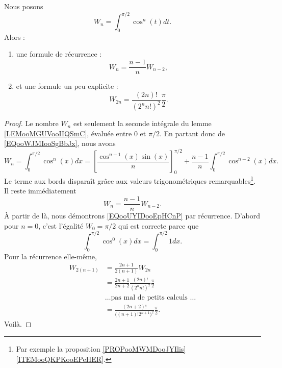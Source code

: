 \begin{lemma}       \label{LEMooUOIBooLyMDft}
	Nous posons
	\begin{equation}
		W_n=\int_0^{\pi/2}\cos^n(t)dt.
	\end{equation}
	Alors :
	\begin{enumerate}
		\item
		      une formule de récurrence :
		      \begin{equation}        \label{EQooILMZooBUgJpk}
			      W_n=\frac{ n-1 }{ n }W_{n-2},
		      \end{equation}
		\item et une formule un peu explicite :
		      \begin{equation}        \label{EQooUYIDooEpHCnP}
			      W_{2n}=\frac{ (2n)! }{ (2^nn!)^2 }\frac{ \pi }{2}.
		      \end{equation}
	\end{enumerate}
\end{lemma}

\begin{proof}
	Le nombre \( W_n\) est seulement la seconde intégrale du lemme \ref{LEMooMGUVooIIQSmC}, évaluée entre \( 0\) et \( \pi/2\). En partant donc de \eqref{EQooWJMIooSgBbJx}, nous avons
	\begin{equation}
		W_n=\int_0^{\pi/2}\cos^n(x)dx=\left[ \frac{ \cos^{n-1}(x)\sin(x) }{ n } \right]_0^{\pi/2}+\frac{ n-1 }{ n }\int_0^{\pi/2}\cos^{n-2}(x)dx.
	\end{equation}
	Le terme aux bords disparaît grâce aux valeurs trigonométriques remarquables\footnote{Par exemple la proposition \ref{PROPooMWMDooJYIlis}\ref{ITEMooQKPKooEPeHER}.}. Il reste immédiatement
	\begin{equation}
		W_n=\frac{ n-1 }{ n }W_{n-2}.
	\end{equation}
	À partir de là, nous démontrons \eqref{EQooUYIDooEpHCnP} par récurrence. D'abord pour \( n=0\), c'est l'égalité \( W_0=\pi/2\) qui est correcte parce que
	\begin{equation}
		\int_0^{\pi/2}\cos^0(x)dx=\int_0^{\pi/2}1dx.
	\end{equation}
	Pour la récurrence elle-même,
	\begin{subequations}
		\begin{align}
			W_{2(n+1)} & =\frac{ 2n+1 }{ 2(n+1) }W_{2n}                                     \\
			           & =\frac{ 2n+1 }{ 2n+2 }\frac{ (2n)! }{ (2^nn!)^2 }\frac{ \pi }{ 2 } \\
			           & \text{\ldots pas mal de petits calculs \ldots}                     \\
			           & =\frac{ (2n+2)! }{ \big( (n+1)!2^{n+1} \big)^2 }\frac{ \pi }{2}.
		\end{align}
	\end{subequations}
	Voilà.
\end{proof}


